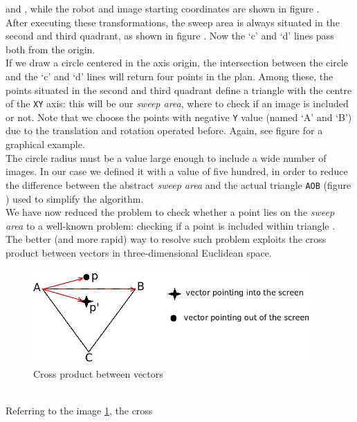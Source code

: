  and , 
while the robot and image starting coordinates are shown in 
figure .
\\
After executing these transformations, the sweep area is always 
situated in the second and third quadrant, as 
shown in figure . Now the `c' and `d' 
lines pass both from the origin.
\\
If we draw a circle centered in the axis origin, the intersection 
between the circle and the `c' and `d' lines will
return four points in the plan. Among these, the points situated 
in the second and third quadrant define a triangle
with the centre of the \texttt{XY} axis: this
will be our \textit{sweep area}, 
where to check if an image is included or not. Note
that we choose the points with negative \texttt{Y} value (named `A' and `B') 
due to the translation and rotation operated
before. Again, see figure  
for a graphical example.
\\
The circle radius must be a value large enough to include a wide 
number of images. In our case we defined it with a
value of five hundred, in order to reduce the difference between 
the abstract \textit{sweep area} and the actual triangle 
\texttt{AOB} (figure ) used to simplify the algorithm.
\\
We have now reduced the problem to check whether a point 
lies on the \textit{sweep area} to a well-known problem:
checking if a point is included within triangle
\cite{withinboundaries:pointintriangle}. 
The better (and more rapid) way to resolve such problem 
exploits the cross product between vectors
in three-dimensional Euclidean space.
\begin{figure}[!h]
  \begin{center}
    \includegraphics[width=300pt]{img/sweepal_crossproductABC.jpeg} 
    \caption{Cross product between vectors}
    \label{fig:sweepal_crossproductABC}
  \end{center}
\end{figure}
\\
Referring to the image \ref{fig:sweepal_crossproductABC}, the cross
